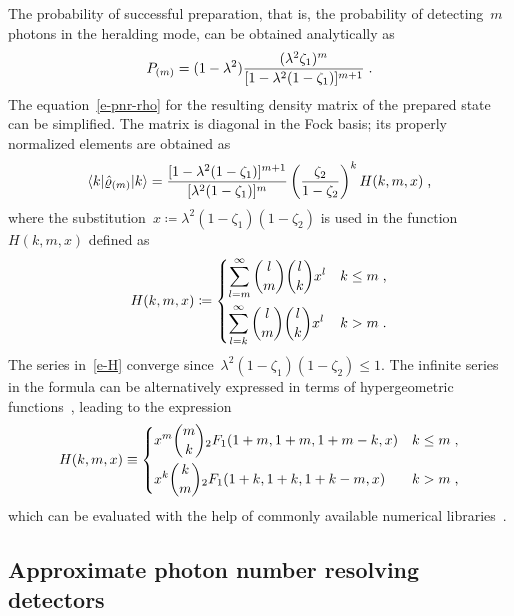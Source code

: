 \documentclass{article}
\begin{document}
The probability of successful preparation, that is, the probability of detecting~$m$ photons in the heralding mode, can be obtained analytically as
%
\begin{equation}\label{e-pnr-pro}
  P_{(m)} = (1 - \lambda^{2}) 
  \frac
    { (\lambda^{2} \zeta_{1})^{m} }
    { [ 1 - \lambda^{2} (1 - \zeta_{1}) ]^{m + 1} } \;\text{.}
\end{equation}
%
The equation~\eqref{e-pnr-rho} for the resulting density matrix of the prepared state can be simplified. The matrix is diagonal in the Fock basis; its properly normalized elements are obtained as
%
\begin{equation}\label{e-pnr-rho-kk}
  \braket{ k | \hat{\varrho}_{(m)} | k } =
  \frac
    { [ 1 - \lambda^{2} (1 - \zeta_{1}) ]^{m + 1} }
    { [ \lambda^{2} (1 - \zeta_{1}) ]^{m} }
  \left( \frac{ \zeta_{2} }{ 1 - \zeta_{2} } \right)^{k}
  H (k, m, x) \;\text{,}
\end{equation}
%
where the substitution~${x \coloneqq \lambda^{2} ( 1 - \zeta_{1} )(1 - \zeta_{2} )}$ is used in the function~$H(k, m, x)$ defined as
%
\begin{equation}\label{e-H}
  H(k, m, x) \coloneq
  \begin{dcases}
    \sum_{l = m}^{\infty}
      \binom{l}{m}
      \binom{l}{k}
      x^{l} 
    & k \leq m \;\text{,} \\
    \sum_{l = k}^{\infty}
      \binom{l}{m}
      \binom{l}{k}
      x^{l}
    & k > m \;\text{.}
  \end{dcases}
\end{equation}
%
The series in~\eqref{e-H} converge since~${\lambda^{2} ( 1 - \zeta_{1} )(1 - \zeta_{2} ) \leq 1}$. The infinite series in the formula can be alternatively expressed in terms of hypergeometric functions~\cite{bateman1981}, leading to the expression
%
\begin{equation}
  H(k, m, x) \equiv
  \begin{dcases}
    x^{m} \binom{m}{k} {}_{2}F_{1} (1 + m, 1 + m, 1 + m - k, x)
    & k \leq m \;\text{,} \\
    x^{k} \binom{k}{m} {}_{2}F_{1} (1 + k, 1 + k, 1 + k - m, x)
    & k > m \;\text{,}
  \end{dcases}
\end{equation}
%
which can be evaluated with the help of commonly available numerical libraries~\cite{virtanen2020}.

\subsection*{Approximate photon number resolving detectors}
\end{document}
